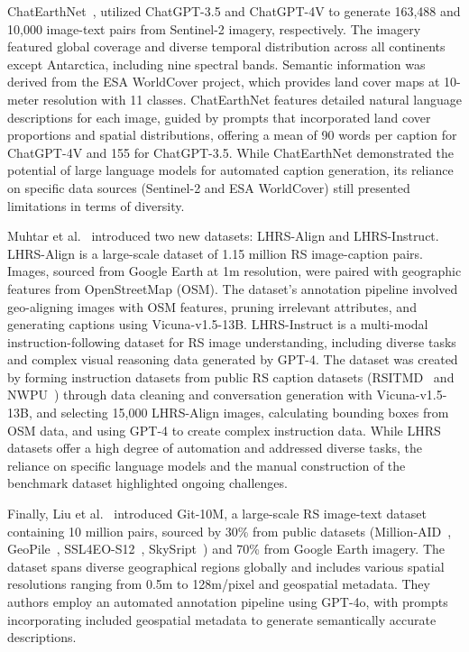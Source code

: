 ChatEarthNet~\cite{yuan2024chatearthnet}, utilized ChatGPT-3.5 and ChatGPT-4V to generate 163,488 and 10,000 image-text pairs from Sentinel-2 imagery, respectively. The imagery featured global coverage and diverse temporal distribution across all continents except Antarctica, including nine spectral bands. Semantic information was derived from the ESA WorldCover project, which provides land cover maps at 10-meter resolution with 11 classes. ChatEarthNet features detailed natural language descriptions for each image, guided by prompts that incorporated land cover proportions and spatial distributions, offering a mean of 90 words per caption for ChatGPT-4V and 155 for ChatGPT-3.5. While ChatEarthNet demonstrated the potential of large language models for automated caption generation, its reliance on specific data sources (Sentinel-2 and ESA WorldCover) still presented limitations in terms of diversity.

Muhtar et al.~\cite{muhtar2024lhrs} introduced two new datasets: LHRS-Align and LHRS-Instruct. LHRS-Align is a large-scale dataset of 1.15 million RS image-caption pairs. Images, sourced from Google Earth at 1m resolution, were paired with geographic features from OpenStreetMap (OSM). The dataset's annotation pipeline involved geo-aligning images with OSM features, pruning irrelevant attributes, and generating captions using Vicuna-v1.5-13B. LHRS-Instruct is a multi-modal instruction-following dataset for RS image understanding, including diverse tasks and complex visual reasoning data generated by GPT-4. The dataset was created by forming instruction datasets from public RS caption datasets (RSITMD~\cite{yuan2022exploring} and NWPU~\cite{cheng2022nwpu}) through data cleaning and conversation generation with Vicuna-v1.5-13B, and selecting 15,000 LHRS-Align images, calculating bounding boxes from OSM data, and using GPT-4 to create complex instruction data. While LHRS datasets offer a high degree of automation and addressed diverse tasks, the reliance on specific language models and the manual construction of the benchmark dataset highlighted ongoing challenges.

Finally, Liu et al.~\cite{liu2025text2earth} introduced Git-10M, a large-scale RS image-text dataset containing 10 million pairs, sourced by 30\% from public datasets (Million-AID~\cite{long2021creating}, GeoPile~\cite{mendieta2023towards}, SSL4EO-S12~\cite{wang2023ssl4eo}, SkySript~\cite{wang2024skyscript}) and 70\% from Google Earth imagery. The dataset spans diverse geographical regions globally and includes various spatial resolutions ranging from 0.5m to 128m/pixel and geospatial metadata. They authors employ an automated annotation pipeline using GPT-4o, with prompts incorporating included geospatial metadata to generate semantically accurate descriptions.

